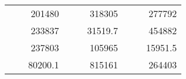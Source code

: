 \begin{table}[H]
\begin{tabular}{|ccrccrccc}
\rowcolor[HTML]{DAE8FC} 
\multicolumn{1}{|c|}{\cellcolor[HTML]{FFFFC7}}                                & \multicolumn{1}{c|}{\cellcolor[HTML]{DAE8FC}}                      & \multicolumn{1}{r|}{\cellcolor[HTML]{DAE8FC}201480}    & \multicolumn{1}{c|}{\cellcolor[HTML]{FFFFC7}}                                & \multicolumn{1}{c|}{\cellcolor[HTML]{DAE8FC}}                       & \multicolumn{1}{r|}{\cellcolor[HTML]{DAE8FC}318305}    & \multicolumn{1}{c|}{\cellcolor[HTML]{FFFFC7}}                                & \multicolumn{1}{c|}{\cellcolor[HTML]{DAE8FC}}                      & \multicolumn{1}{r|}{\cellcolor[HTML]{DAE8FC}277792}    \\ \cline{3-3} \cline{6-6} \cline{9-9} 
\multicolumn{1}{|c|}{\cellcolor[HTML]{FFFFC7}}                                & \multicolumn{1}{c|}{\cellcolor[HTML]{DAE8FC}}                      & \multicolumn{1}{r|}{\cellcolor[HTML]{DDFDFF}233837}    & \multicolumn{1}{c|}{\cellcolor[HTML]{FFFFC7}}                                & \multicolumn{1}{c|}{\cellcolor[HTML]{DAE8FC}}                       & \multicolumn{1}{r|}{\cellcolor[HTML]{DDFDFF}31519.7}   & \multicolumn{1}{c|}{\cellcolor[HTML]{FFFFC7}}                                & \multicolumn{1}{c|}{\cellcolor[HTML]{DAE8FC}}                      & \multicolumn{1}{r|}{\cellcolor[HTML]{DDFDFF}454882}    \\ \cline{3-3} \cline{6-6} \cline{9-9} 
\rowcolor[HTML]{DAE8FC} 
\multicolumn{1}{|c|}{\cellcolor[HTML]{FFFFC7}}                                & \multicolumn{1}{c|}{\cellcolor[HTML]{DAE8FC}}                      & \multicolumn{1}{r|}{\cellcolor[HTML]{DAE8FC}237803}    & \multicolumn{1}{c|}{\cellcolor[HTML]{FFFFC7}}                                & \multicolumn{1}{c|}{\cellcolor[HTML]{DAE8FC}}                       & \multicolumn{1}{r|}{\cellcolor[HTML]{DAE8FC}105965}    & \multicolumn{1}{c|}{\cellcolor[HTML]{FFFFC7}}                                & \multicolumn{1}{c|}{\cellcolor[HTML]{DAE8FC}}                      & \multicolumn{1}{r|}{\cellcolor[HTML]{DAE8FC}15951.5}   \\ \cline{3-3} \cline{6-6} \cline{9-9} 
\multicolumn{1}{|c|}{\cellcolor[HTML]{FFFFC7}}                                & \multicolumn{1}{c|}{\cellcolor[HTML]{DAE8FC}}                      & \multicolumn{1}{r|}{\cellcolor[HTML]{DDFDFF}80200.1}   & \multicolumn{1}{c|}{\cellcolor[HTML]{FFFFC7}}                                & \multicolumn{1}{c|}{\cellcolor[HTML]{DAE8FC}}                       & \multicolumn{1}{r|}{\cellcolor[HTML]{DDFDFF}815161}    & \multicolumn{1}{c|}{\cellcolor[HTML]{FFFFC7}}                                & \multicolumn{1}{c|}{\cellcolor[HTML]{DAE8FC}}                      & \multicolumn{1}{r|}{\cellcolor[HTML]{DDFDFF}264403}    \\ \cline{3-3} \cline{6-6} \cline{9-9} 

\end{tabular}
\end{table}

